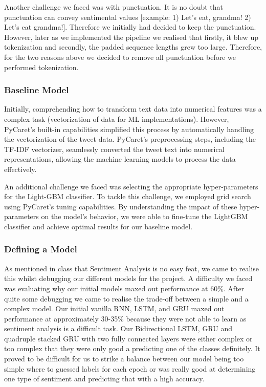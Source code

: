 Another challenge we faced was with punctuation. It is no doubt that punctuation can convey sentimental values [example: 1) Let's eat, grandma! 2) Let's eat grandma!]. Therefore we initially had decided to keep the punctuation. However, later as we implemented the pipeline we realised that firstly, it blew up tokenization and secondly, the padded sequence lengths grew too large. Therefore, for the two reasons above we decided to remove all punctuation before we performed tokenization.
\vspace{-1em}
\subsubsection{Baseline Model}
\vspace{-0.5em}
Initially, comprehending how to transform text data into numerical features was a complex task (vectorization of data for ML implementations). However, PyCaret’s built-in capabilities simplified this process by automatically handling the vectorization of the tweet data. PyCaret’s preprocessing steps, including the TF-IDF vectorizer, seamlessly converted the tweet text into numerical representations, allowing the machine learning models to process the data effectively.

An additional challenge we faced was selecting the appropriate hyper-parameters for the Light-GBM classifier. To tackle this challenge, we employed grid search using PyCaret’s tuning capabilities. By understanding the impact of these hyper-parameters on the model’s behavior, we were
able to fine-tune the LightGBM classifier and achieve optimal results for our baseline model.
\vspace{-1em}
\subsubsection{Defining a Model}
\vspace{-0.5em}
As mentioned in class that Sentiment Analysis is no easy feat, we came to realise this whilst debugging our different models for the project. A difficulty we faced was evaluating why our initial models maxed out performance at 60\%. After quite some debugging we came to realise the trade-off between a simple and a complex model. Our initial vanilla RNN, LSTM, and GRU maxed out performance at approximately 30-35\% because they were not able to learn as sentiment analysis is a difficult task. Our Bidirectional LSTM, GRU and quadruple stacked GRU with two fully connected layers were either complex or too complex that they were only good a predicting one of the classes definitely. It proved to be difficult for us to strike a balance between our model being too simple where to guessed labels for each epoch or was really good at determining one type of sentiment and predicting that with a high accuracy.
\vspace{-1em}
